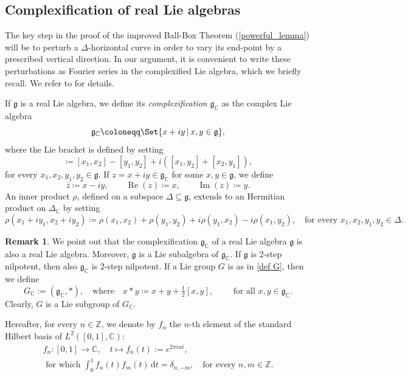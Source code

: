 \documentclass[a4paper,11pt,reqno]{amsart}
\theoremstyle{plain}
\theoremstyle{definition}
\newtheorem{remark}[theorem]{Remark}
\newcommand{\re}{\operatorname{Re}}
\newcommand{\im}{\operatorname{Im}}
\newcommand{\Z}{\mathbb Z}
\newcommand{\C}{\mathbb C}
\newcommand{\g}{\mathfrak{g}}
\newcommand{\de}{\mathrm{d}}
\newcommand{\coloneq}{\coloneqq}
\begin{document}
\subsection{Complexification of real Lie algebras} The key step in the proof of the improved Ball-Box Theorem (\cref{powerful_lemma}) will be to perturb a $\Delta$-horizontal curve in order to vary its end-point by a prescribed vertical direction. In our argument, it is convenient to write these perturbations as Fourier series in the complexified Lie algebra, which we briefly recall. We refer to \cite[Section~5.1.4]{hilgert2011structure} for details.

If $\g$ is a real Lie algebra, we define its \emph{complexification} $\g_\C$ as the complex Lie algebra $$\g_\C \coloneq \Set{ x + iy \, | \, x,y \in \g},$$ where the Lie bracket is defined by setting
\begin{equation*} 
 [x_1 + iy_1,x_2+iy_2] \coloneq [x_1,x_2]-[y_1,y_2] + i\left([x_1,y_2]+[x_2,y_1]\right),
\end{equation*}
for every $x_1,x_2,y_1,y_2 \in \g$. If $z = x + iy \in \g_\C$ for some $x,y \in \g$, we define
\begin{equation*}
 \bar{z} \coloneq x-iy, \qquad \re(z) \coloneq x, \qquad \im(z)\coloneq y.
\end{equation*}
An inner product $\rho$, defined on a subspace $\Delta \subseteq \g$, extends to an Hermitian product on $\Delta_\C$ by setting
$$ \rho(x_1+iy_1,x_2+iy_2) \coloneq \rho(x_1,x_2) + \rho(y_1,y_2) + i\rho(y_1,x_2)- i\rho(x_1,y_2), \quad \text{for every $x_1,x_2,y_1,y_2 \in \Delta$.}$$

\begin{remark}
 We point out that the complexification $\g_\C$ of a real Lie algebra $\g$ is also a real Lie algebra. Moreover, $\g$ is a Lie subalgebra of $\g_\C$. If $\g$ is 2-step nilpotent, then also $\g_\C$ is 2-step nilpotent. If a Lie group $G$ is as in \eqref{def G}, then we define 
 \begin{equation} \label{def Gc}
 G_\C:= (\g_\C,*), \quad \text{where} \quad x*y \coloneq x+y+\tfrac{1}{2}[x,y], \qquad \text{ for all } x,y \in \g_\C.
\end{equation}
Clearly, $G$ is a Lie subgroup of $G_\C$.
\end{remark}

Hereafter, for every $n \in \Z$, we denote by $f_n$ the $n$-th element of the standard Hilbert basis of $L^2([0,1],\C)$:
\begin{gather} 
 f_n \colon [0,1] \to \C, \quad t \mapsto f_n(t):= e^{2\pi i n t}, \label{def_f}\\
 \text { for which }\int^1_0 f_n(t)f_m(t) \, \de t = \delta_{n,-m}, \quad \text{for every $n,m \in \Z$.} \label{def_f_prop}
\end{gather}
\end{document}
